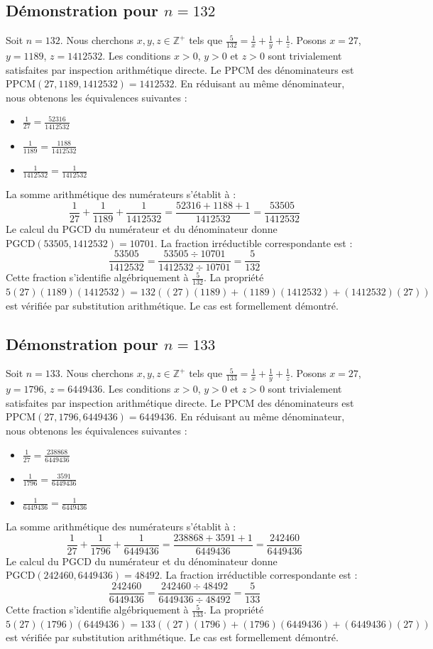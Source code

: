 \documentclass[12pt,a4paper]{article}
\begin{document}
\subsection{Démonstration pour $n = 132$}
Soit $n = 132$. Nous cherchons $x, y, z \in \mathbb{Z}^{+}$ tels que $\frac{5}{132} = \frac{1}{x} + \frac{1}{y} + \frac{1}{z}$.
Posons $x = 27$, $y = 1189$, $z = 1412532$.
Les conditions $x > 0$, $y > 0$ et $z > 0$ sont trivialement satisfaites par inspection arithmétique directe.
Le PPCM des dénominateurs est $\text{PPCM}(27, 1189, 1412532) = 1412532$.
En réduisant au même dénominateur, nous obtenons les équivalences suivantes :
\begin{itemize}
    \item $\frac{1}{27} = \frac{52316}{1412532}$
    \item $\frac{1}{1189} = \frac{1188}{1412532}$
    \item $\frac{1}{1412532} = \frac{1}{1412532}$
\end{itemize}
La somme arithmétique des numérateurs s'établit à :
$$ \frac{1}{27} + \frac{1}{1189} + \frac{1}{1412532} = \frac{52316 + 1188 + 1}{1412532} = \frac{53505}{1412532} $$
Le calcul du PGCD du numérateur et du dénominateur donne $\text{PGCD}(53505, 1412532) = 10701$.
La fraction irréductible correspondante est :
$$ \frac{53505}{1412532} = \frac{53505 \div 10701}{1412532 \div 10701} = \frac{5}{132} $$
Cette fraction s'identifie algébriquement à $\frac{5}{132}$.
La propriété $5(27)(1189)(1412532) = 132((27)(1189) + (1189)(1412532) + (1412532)(27))$ est vérifiée par substitution arithmétique.
Le cas est formellement démontré.

\subsection{Démonstration pour $n = 133$}
Soit $n = 133$. Nous cherchons $x, y, z \in \mathbb{Z}^{+}$ tels que $\frac{5}{133} = \frac{1}{x} + \frac{1}{y} + \frac{1}{z}$.
Posons $x = 27$, $y = 1796$, $z = 6449436$.
Les conditions $x > 0$, $y > 0$ et $z > 0$ sont trivialement satisfaites par inspection arithmétique directe.
Le PPCM des dénominateurs est $\text{PPCM}(27, 1796, 6449436) = 6449436$.
En réduisant au même dénominateur, nous obtenons les équivalences suivantes :
\begin{itemize}
    \item $\frac{1}{27} = \frac{238868}{6449436}$
    \item $\frac{1}{1796} = \frac{3591}{6449436}$
    \item $\frac{1}{6449436} = \frac{1}{6449436}$
\end{itemize}
La somme arithmétique des numérateurs s'établit à :
$$ \frac{1}{27} + \frac{1}{1796} + \frac{1}{6449436} = \frac{238868 + 3591 + 1}{6449436} = \frac{242460}{6449436} $$
Le calcul du PGCD du numérateur et du dénominateur donne $\text{PGCD}(242460, 6449436) = 48492$.
La fraction irréductible correspondante est :
$$ \frac{242460}{6449436} = \frac{242460 \div 48492}{6449436 \div 48492} = \frac{5}{133} $$
Cette fraction s'identifie algébriquement à $\frac{5}{133}$.
La propriété $5(27)(1796)(6449436) = 133((27)(1796) + (1796)(6449436) + (6449436)(27))$ est vérifiée par substitution arithmétique.
Le cas est formellement démontré.
\end{document}
